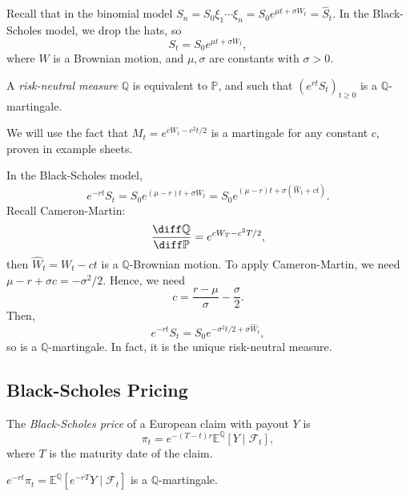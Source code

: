 \documentclass[12pt]{article}
\begin{document}
Recall that in the binomial model $S_n = S_0 \xi_1 \cdots \xi_n = S_0 e^{\mu t + \sigma W_t} = \hat S_t$. In the Black-Scholes model,  we drop the hats, so
\[
S_t = S_0 e^{\mu t + \sigma W_t},
\]
where $W$ is a Brownian motion, and $\mu, \sigma$ are constants with $\sigma > 0$.

\begin{definition}
	A \emph{risk-neutral measure}  $\mathbb{Q}$ is equivalent to $\mathbb{P}$, and such that $(e^{rt}S_t)_{t \geq 0}$ is a $\mathbb{Q}$-martingale.
\end{definition}

We will use the fact that $M_t = e^{c W_t - c^2t/2}$ is a martingale for any constant $c$, proven in example sheets.

In the Black-Scholes model,
\[
e^{-rt}S_t = S_0 e^{(\mu - r)t + \sigma W_t} = S_0 e^{(\mu - r)t + \sigma(\hat W_t + ct)}.
\]
Recall Cameron-Martin:
\[
\frac{\diff \mathbb{Q}}{\diff \mathbb{P}} = e^{c W_T - c^2T/2},
\]
then $\hat W_t = W_t - ct$ is a $\mathbb{Q}$-Brownian motion. To apply Cameron-Martin, we need $\mu -r + \sigma c = - \sigma^2/2$. Hence, we need
\[
c = \frac{r - \mu}{\sigma} - \frac{\sigma}{2}.
\]
Then,
\[
e^{-rt}S_t = S_0 e^{-\sigma^2t/2 + \sigma \hat W_t},
\]
so is a $\mathbb{Q}$-martingale. In fact, it is the unique risk-neutral measure.

\subsection{Black-Scholes Pricing}%
\label{sub:bs_price}

\begin{definition}
	The \emph{Black-Scholes price} of a European claim with payout $Y$ is
	\[
	\pi_t = e^{-(T - t)r} \mathbb{E}^{\mathbb{Q}}[Y \mid \mathcal{F}_t],
	\]
	where $T$ is the maturity date of the claim.
\end{definition}

\begin{remark}
	$e^{-rt}\pi_t = \mathbb{E}^{\mathbb{Q}}[e^{-rT}Y \mid \mathcal{F}_t]$ is a $\mathbb{Q}$-martingale.
\end{remark}
\end{document}
